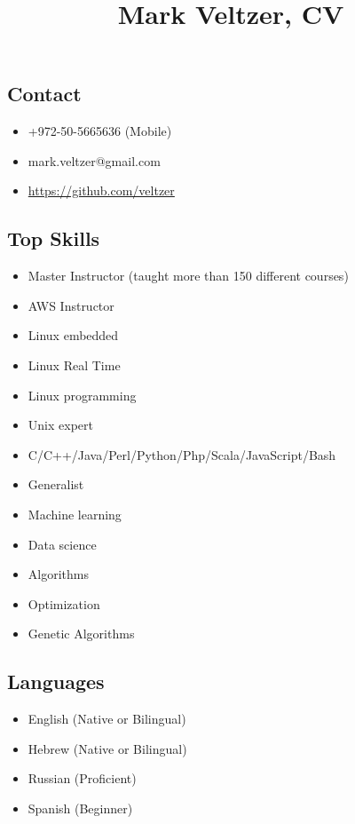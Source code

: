 \documentclass[
]{article}
\title{Mark Veltzer, CV}
\author{}
\date{}
\providecommand{\tightlist}{%
  \setlength{\itemsep}{0pt}\setlength{\parskip}{0pt}}
\begin{document}
\maketitle

\subsection{Contact}\label{contact}

\begin{itemize}
\tightlist
\item
  +972-50-5665636 (Mobile)
\item
  mark.veltzer@gmail.com
\item
  \url{https://github.com/veltzer}
\end{itemize}

\subsection{Top Skills}\label{top-skills}

\begin{itemize}
\tightlist
\item
  Master Instructor (taught more than 150 different courses)
\item
  AWS Instructor
\item
  Linux embedded
\item
  Linux Real Time
\item
  Linux programming
\item
  Unix expert
\item
  C/C++/Java/Perl/Python/Php/Scala/JavaScript/Bash
\item
  Generalist
\item
  Machine learning
\item
  Data science
\item
  Algorithms
\item
  Optimization
\item
  Genetic Algorithms
\end{itemize}

\subsection{Languages}\label{languages}

\begin{itemize}
\tightlist
\item
  English (Native or Bilingual)
\item
  Hebrew (Native or Bilingual)
\item
  Russian (Proficient)
\item
  Spanish (Beginner)
\end{itemize}
\end{document}
